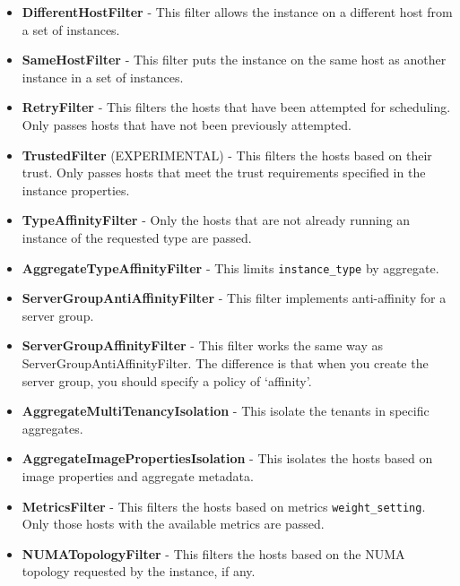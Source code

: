 \begin{itemize}
    \item \textbf{DifferentHostFilter} - This filter allows the instance on a different host from a set of instances.

    \item \textbf{SameHostFilter} - This filter puts the instance on the same host as another instance in a set of instances.

    \item \textbf{RetryFilter} - This filters the hosts that have been attempted for scheduling. Only passes hosts that have not been previously attempted.

    \item \textbf{TrustedFilter} (EXPERIMENTAL) - This filters the hosts based on their trust. Only passes hosts that meet the trust requirements specified in the instance properties.

    \item \textbf{TypeAffinityFilter} - Only the hosts that are not already running an instance of the requested type are passed.

    \item \textbf{AggregateTypeAffinityFilter} - This limits \verb|instance_type| by aggregate.

    \item \textbf{ServerGroupAntiAffinityFilter} - This filter implements anti-affinity for a server group.

    \item \textbf{ServerGroupAffinityFilter} - This filter works the same way as ServerGroupAntiAffinityFilter. The difference is that when you create the server group, you should specify a policy of ‘affinity’.

    \item \textbf{AggregateMultiTenancyIsolation} - This isolate the tenants in specific aggregates.

    \item \textbf{AggregateImagePropertiesIsolation} - This isolates the hosts based on image properties and aggregate metadata.

    \item \textbf{MetricsFilter} - This filters the hosts based on metrics \verb|weight_setting|. Only those hosts with the available metrics are passed.

    \item \textbf{NUMATopologyFilter} - This filters the hosts based on the NUMA topology requested by the instance, if any.
\end{itemize}

